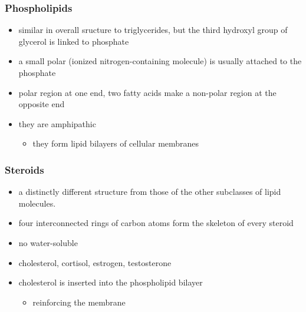 \documentclass[11pt]{article}
\begin{document}
\subsubsection{Phospholipids}
\label{sec:orgfb3887c}
\begin{itemize}
\item similar in overall sructure to triglycerides, but the third hydroxyl group of glycerol is linked to phosphate
\item a small polar (ionized nitrogen-containing molecule) is usually attached to the phosphate
\item polar region at one end, two fatty acids make a non-polar region at the opposite end
\item they are amphipathic
\begin{itemize}
\item they form lipid bilayers of cellular membranes
\end{itemize}
\end{itemize}
\subsubsection{Steroids}
\label{sec:org19c047f}
\begin{itemize}
\item a distinctly different structure from those of the other subclasses of lipid molecules.
\item four interconnected rings of carbon atoms form the skeleton of every steroid
\item no water-soluble
\item cholesterol, cortisol, estrogen, testosterone
\item cholesterol is inserted into the phospholipid bilayer
\begin{itemize}
\item reinforcing the membrane
\end{itemize}
\end{itemize}
\end{document}
